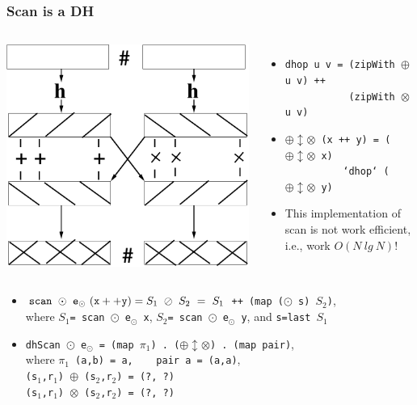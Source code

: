 \documentclass{beamer}
\begin{document}
\begin{frame}[fragile,t]
  \frametitle{Scan is a DH}

\begin{columns}
\includegraphics[height=25ex]{Figures/DH}
\vspace{-3ex}
\begin{itemize}
    \item {\tt dhop u v = (zipWith $\oplus$ u v) ++}\\ 
          {\tt~~~~~~~~~~~(zipWith $\otimes$ u v)}
    \item {\tt $\oplus\updownarrow\otimes$ (x ++ y) = ($\oplus\updownarrow\otimes$ x)}\\
          {\tt~~~~~~~~~~`dhop` ($\oplus\updownarrow\otimes$ y)} 
    \item \alert{This implementation of scan is not work efficient,
                i.e., work $O(N \ lg \ N)$!}
\end{itemize}
\end{columns}


\begin{itemize}
    \item ${\tt scan} \ \odot \ {\tt e}_{\odot} \ {\tt(x++y)} = S_1~\oslash~S_2~=~S_1$
            {\tt ++ (map ($\odot$ s) $S_2$)},\\ 
            where $S_1${\tt = scan $\odot$ e$_{\odot}$ x},
                  $S_2${\tt = scan $\odot$ e$_{\odot}$ y}, and {\tt s=last $S_1$}\medskip
 
    \item {\tt dhScan $\odot$ e$_{\odot}$ = (map $\pi_1$) . ($\oplus\updownarrow\otimes$) . (map pair)},\\
            where {\tt $\pi_1$ (a,b) = a,~~~~pair a = (a,a)},\\
            {\tt (s$_1$,r$_1$) $\oplus$ (s$_2$,r$_2$) = (\alert{?}, \alert{?})}\\
            {\tt (s$_1$,r$_1$) $\otimes$ (s$_2$,r$_2$) = (\alert{?}, \alert{?})}
\end{itemize}

\end{frame}
\end{document}
